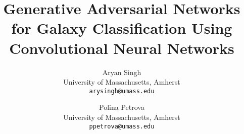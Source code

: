 \documentclass[10pt,twocolumn,letterpaper]{article}
\title{Generative Adversarial Networks for Galaxy Classification Using Convolutional Neural Networks}
\author{Aryan Singh\\
University of Massachusetts, Amherst\\
{\tt\small arysingh@umass.edu}
\and
Polina Petrova\\
University of Massachusetts, Amherst\\
{\tt\small ppetrova@umass.edu}
}
\begin{document}
\maketitle


{
    \small
    
    
}

% 
\end{document}
